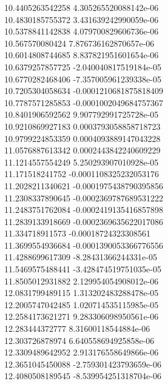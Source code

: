 {10.4405263542258 4.305265520088142e-06 \\
10.4830185755372 3.431639242990059e-06 \\
10.5378841142838 4.079700829606736e-06 \\
10.567570080424 7.876736162870657e-06 \\
10.6014808744685 8.837821951601654e-06 \\
10.6379257857725 -2.040040817519184e-05 \\
10.6770282468406 -7.357005961239338e-05 \\
10.7205304058634 -0.0001210681875818409 \\
10.7787571285853 -0.0001002049684757367 \\
10.8401906592562 9.907792991725728e-05 \\
10.9210869927183 0.0003793058858718723 \\
10.9799224853359 0.0004093889147043228 \\
11.0576887613342 0.0002443842240609229 \\
11.1214557554249 5.250293907010928e-05 \\
11.171518241752 -0.0001108325232053176 \\
11.2028211340621 -0.0001975438790395856 \\
11.2308337890645 -0.0002369787689531222 \\
11.2483751762084 -0.0002419135416857898 \\
11.2839133918669 -0.0002369635622017086 \\
11.334718911573 -0.00018724323308561 \\
11.3699554936684 -0.0001390053366776556 \\
11.4288699617309 -8.28431366244331e-05 \\
11.5469575488441 -3.428474519751035e-05 \\
11.8505012931882 2.129954054908012e-06 \\
12.0831799489115 1.313202483288478e-05 \\
12.2005747042485 1.020714535115985e-05 \\
12.2584173621271 9.283306098950561e-06 \\
12.283444372777 8.31600118544884e-06 \\
12.303726878974 6.640558694925858e-06 \\
12.3309489642952 2.913176558649866e-06 \\
12.3651045450088 -2.759301423793659e-06 \\
12.4080508189545 -8.539954251318704e-06 \\
}
